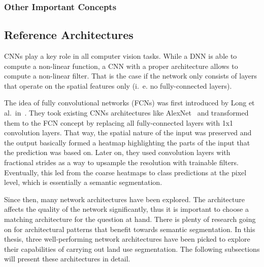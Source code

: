 \subsubsection{Other Important Concepts}

\subsection{Reference Architectures}
\label{sec:ref_archs}
CNNs play a key role in all computer vision tasks. While a DNN is able to compute a non-linear function, a CNN with a proper architecture allows to compute a non-linear filter. That is the case if the network only consists of layers that operate on the spatial features only (i.~e. no fully-connected layers).

The idea of fully convolutional networks (FCNs) was first introduced by Long et al.\ in~\cite{fcn15}. They took existing CNNs architectures like AlexNet~\cite{alexnet12} and transformed them to the FCN concept by replacing all fully-connected layers with 1x1 convolution layers. That way, the spatial nature of the input was preserved and the output basically formed a heatmap highlighting the parts of the input that the prediction was based on. Later on, they used convolution layers with fractional strides as a way to upsample the resolution with trainable filters. Eventually, this led from the coarse heatmaps to class predictions at the pixel level, which is essentially a semantic segmentation.

Since then, many network architectures have been explored. The architecture affects the quality of the network significantly, thus it is important to choose a matching architecture for the question at hand. There is plenty of research going on for architectural patterns that benefit towards semantic segmentation. In this thesis, three well-performing network architectures have been picked to explore their capabilities of carrying out land use segmentation. The following subsections will present these architectures in detail.


